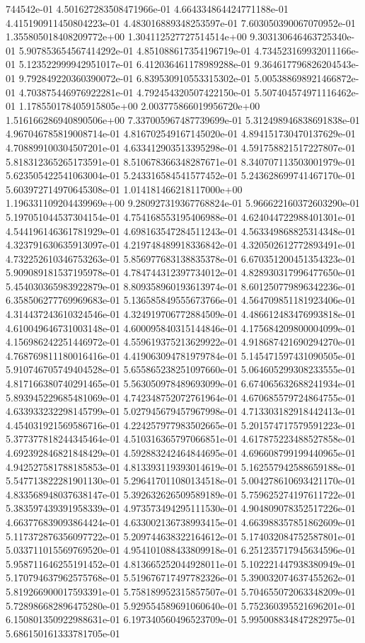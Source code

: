 744542e-01	4.501627283508471966e-01	4.664334864424771188e-01	4.415190911450804223e-01	4.483016889348253597e-01	7.603050390067070952e-01	1.355805018408209772e+00	1.304112527727514514e+00	9.303130646463725340e-01	5.907853654567414292e-01	4.851088617354196719e-01	4.734523169932011166e-01	5.123522999942951017e-01	6.412036461178989288e-01	9.364617796826204543e-01	9.792849220360390072e-01	6.839530910553315302e-01	5.005388698921466872e-01	4.703875446976922281e-01	4.792454320507422150e-01	5.507404574971116462e-01	1.178550178405915805e+00	2.003775866019956720e+00	1.516166286940890506e+00	7.337005967487739699e-01	5.312498946838691838e-01	4.967046785819008714e-01	4.816702549167145020e-01	4.894151730470137629e-01	4.708899100304507201e-01	4.633412903513395298e-01	4.591758821517227807e-01	5.818312365265173591e-01	8.510678366348287671e-01	8.340707113503001979e-01	5.623505422541063004e-01	5.243316584541577452e-01	5.243628699741467170e-01	5.603972714970645308e-01	1.014181466218117000e+00	1.196331109204439969e+00	9.280927319367768824e-01	5.966622160372603290e-01	5.197051044537304154e-01	4.754168553195406988e-01	4.624044722988401301e-01	4.544196146361781929e-01	4.698163547284511243e-01	4.563349868825314348e-01	4.323791630635913097e-01	4.219748489918336842e-01	4.320502612772893491e-01	4.732252610346753263e-01	5.856977683138835378e-01	6.670351200451354323e-01	5.909089181537195978e-01	4.784744312397734012e-01	4.828930317996477650e-01	5.454030365983922879e-01	8.809358960193613974e-01	8.601250779896342236e-01	6.358506277769969683e-01	5.136585849555673766e-01	4.564709851181923406e-01	4.314437243610324546e-01	4.324919706772884509e-01	4.486612483476993818e-01	4.610049646731003148e-01	4.600095840315144846e-01	4.175684209800004099e-01	4.156986242251446972e-01	4.559619375213629922e-01	4.918687421690294270e-01	4.768769811180016416e-01	4.419063094781979784e-01	5.145471597431090505e-01	5.910746705749404528e-01	5.655865238251097660e-01	5.064605299308233555e-01	4.817166380740291465e-01	5.563050978489693099e-01	6.674065632688241934e-01	5.893945229685481069e-01	4.742348752072761964e-01	4.670685579724864755e-01	4.633933232298145799e-01	5.027945679457967998e-01	4.713303182918442413e-01	4.454031921569586716e-01	4.224257977983502665e-01	5.201574717579591223e-01	5.377377818244345464e-01	4.510316365797066851e-01	4.617875223488527858e-01	4.692392846821848429e-01	4.592883242464844695e-01	4.696608799199440965e-01	4.942527581788185853e-01	4.813393119393014619e-01	5.162557942588659188e-01	5.547713822281901130e-01	5.296417011080134518e-01	5.004278610693421170e-01	4.833568948037638147e-01	5.392632626509589189e-01	5.759625274197611722e-01	5.383597439391958339e-01	4.973573494295111530e-01	4.904809078352517226e-01	4.663776839093864424e-01	4.633002136738993415e-01	4.663988357851862609e-01	5.117372876356097722e-01	5.209744638322164612e-01	5.174032084752587801e-01	5.033711015569769520e-01	4.954101088433809918e-01	6.251235717945634596e-01	5.958711646255191452e-01	4.813665252044928011e-01	5.102221447938380949e-01	5.170794637962575768e-01	5.519676717497782326e-01	5.390032074637455262e-01	5.819266900017593391e-01	5.758189952315857507e-01	5.704655072063348209e-01	5.728986682896475280e-01	5.929554589691060640e-01	5.752360395521696201e-01	6.150801350922988631e-01	6.197340560496523709e-01	5.995008834847282975e-01	5.686150161333781705e-01	